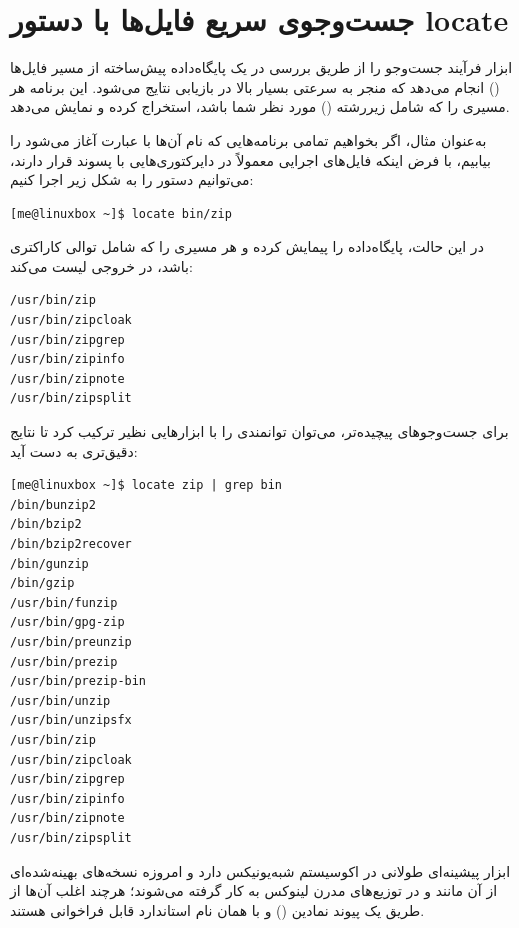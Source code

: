 \section{جست‌وجوی سریع فایل‌ها با دستور locate}

ابزار  فرآیند جست‌وجو را از طریق بررسی در یک پایگاه‌داده پیش‌ساخته از مسیر فایل‌ها () انجام می‌دهد که منجر به سرعتی بسیار بالا در بازیابی نتایج می‌شود. این برنامه هر مسیری را که شامل زیررشته () مورد نظر شما باشد، استخراج کرده و نمایش می‌دهد.

به‌عنوان مثال، اگر بخواهیم تمامی برنامه‌هایی که نام آن‌ها با عبارت  آغاز می‌شود را بیابیم، با فرض اینکه فایل‌های اجرایی معمولاً در دایرکتوری‌هایی با پسوند  قرار دارند، می‌توانیم دستور را به شکل زیر اجرا کنیم:

\begin{latin}
\begin{lstlisting}
[me@linuxbox ~]$ locate bin/zip
\end{lstlisting}
\end{latin}

در این حالت،  پایگاه‌داده را پیمایش کرده و هر مسیری را که شامل توالی کاراکتری  باشد، در خروجی لیست می‌کند:

\begin{latin}
\begin{lstlisting}
/usr/bin/zip
/usr/bin/zipcloak
/usr/bin/zipgrep
/usr/bin/zipinfo
/usr/bin/zipnote
/usr/bin/zipsplit
\end{lstlisting}
\end{latin}

برای جست‌وجوهای پیچیده‌تر، می‌توان توانمندی  را با ابزارهایی نظیر  ترکیب کرد تا نتایج دقیق‌تری به دست آید:

\begin{latin}
\begin{lstlisting}
[me@linuxbox ~]$ locate zip | grep bin
/bin/bunzip2
/bin/bzip2
/bin/bzip2recover
/bin/gunzip
/bin/gzip
/usr/bin/funzip
/usr/bin/gpg-zip
/usr/bin/preunzip
/usr/bin/prezip
/usr/bin/prezip-bin
/usr/bin/unzip
/usr/bin/unzipsfx
/usr/bin/zip
/usr/bin/zipcloak
/usr/bin/zipgrep
/usr/bin/zipinfo
/usr/bin/zipnote
/usr/bin/zipsplit
\end{lstlisting}
\end{latin}

ابزار  پیشینه‌ای طولانی در اکوسیستم شبه‌یونیکس دارد و امروزه نسخه‌های بهینه‌شده‌ای از آن مانند  و  در توزیع‌های مدرن لینوکس به کار گرفته می‌شوند؛ هرچند اغلب آن‌ها از طریق یک پیوند نمادین () و با همان نام استاندارد  قابل فراخوانی هستند.

